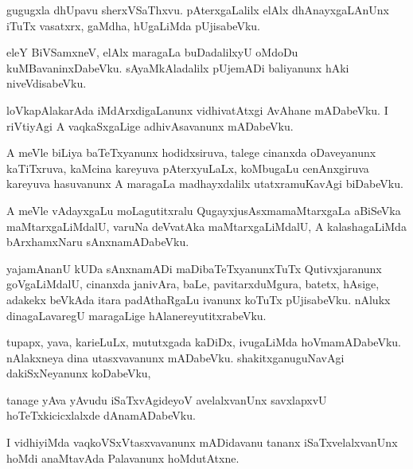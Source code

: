 \documentclass{article}
\begin{document}
\begin{mn}
gugugxla  dhUpavu  sherxVSaThxvu.  pAterxgaLalilx  elAlx  dhAnayxgaLAnUnx  iTuTx  vasatxrx,  gaMdha,  
hUgaLiMda  pUjisabeVku.
\end{mn}

\begin{mn}
eleY  BiVSamxneV,  elAlx  maragaLa  buDadalilxyU  oMdoDu  kuMBavaninxDabeVku.  sAyaMkAladalilx  pUjemADi  
baliyanunx  hAki  niveVdisabeVku.
\end{mn}

\begin{mn}
loVkapAlakarAda  iMdArxdigaLanunx  vidhivatAtxgi  AvAhane  mADabeVku.  I riVtiyAgi  A  vaqkaSxgaLige  
adhivAsavanunx  mADabeVku.
\end{mn}

\begin{mn}
A meVle  biLiya baTeTxyanunx  hodidxsiruva,  talege  cinanxda  oDaveyanunx  kaTiTxruva,  kaMcina  kareyuva  
pAterxyuLaLx,  koMbugaLu  cenAnxgiruva  kareyuva  hasuvanunx  A  maragaLa  madhayxdalilx  utatxramuKavAgi  biDabeVku.
\end{mn}

\begin{mn}
A meVle  vAdayxgaLu  moLagutitxralu  QugayxjusAsxmamaMtarxgaLa  aBiSeVka  maMtarxgaLiMdalU,  varuNa  
deVvatAka  maMtarxgaLiMdalU,  A  kalashagaLiMda  bArxhamxNaru  sAnxnamADabeVku.
\end{mn}

\begin{mn}
yajamAnanU  kUDa  sAnxnamADi  maDibaTeTxyanunxTuTx  Qutivxjaranunx  goVgaLiMdalU,  cinanxda  
janivAra,  baLe,  pavitarxduMgura,  batetx,  hAsige,  adakekx beVkAda  itara  padAthaRgaLu  
ivanunx  koTuTx  pUjisabeVku.  nAlukx  dinagaLavaregU  maragaLige  hAlanereyutitxrabeVku.
\end{mn}

\begin{mn}
tupapx,  yava,  karieLuLx,  mututxgada  kaDiDx,  ivugaLiMda  hoVmamADabeVku.  nAlakxneya  dina  
utasxvavanunx  mADabeVku.  shakitxganuguNavAgi  dakiSxNeyanunx  koDabeVku,
\end{mn}

\begin{mn}
tanage  yAva yAvudu  iSaTxvAgideyoV  avelalxvanUnx  savxlapxvU  hoTeTxkicicxlalxde  dAnamADabeVku.
\end{mn}

\begin{mn}
I  vidhiyiMda  vaqkoVSxVtasxvavanunx  mADidavanu  tananx  iSaTxvelalxvanUnx  hoMdi  anaMtavAda  Palavanunx  hoMdutAtxne.
\end{mn}
\end{document}
